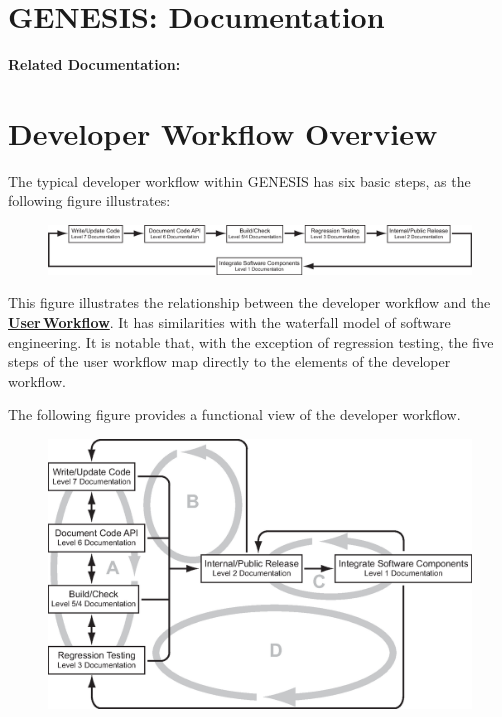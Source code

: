 \documentclass[12pt]{article}
\begin{document}
\section*{GENESIS: Documentation}

{\bf Related Documentation:}

\section*{Developer Workflow Overview}

The typical developer workflow within GENESIS has six basic steps, as the following figure illustrates:
 \begin{figure}[h]
    \centering
    \includegraphics[scale=0.5]{figures/workflow-developer.eps}
    \label{fig:df-1}
 \end{figure}

This figure illustrates the relationship between the developer workflow and the \href{../workflow-user/workflow-user.tex}{\bf User\,Workflow}. It has similarities with the waterfall model of software engineering. It is notable that, with the exception of regression testing, the five steps of the user workflow map directly to the elements of the developer workflow.

The following figure provides a functional view of the developer workflow.
 \begin{figure}[h]
    \centering
    \includegraphics[scale=0.6]{figures/workflow-developer-functional.eps}
    \label{fig:df-1}
 \end{figure}
\end{document}
